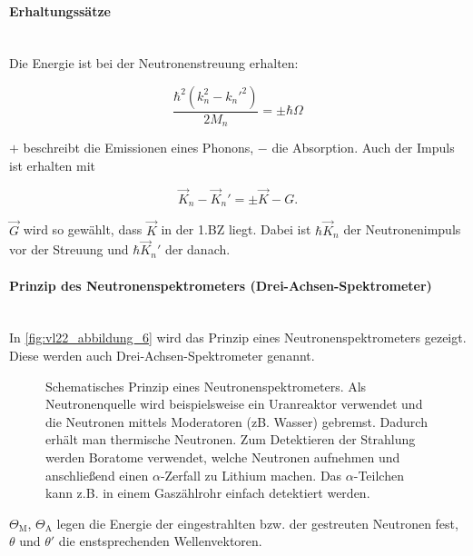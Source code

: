 \paragraph{Erhaltungssätze}~\\
 Die Energie ist bei der Neutronenstreuung erhalten:
	\begin{important}
		$$
		\frac{\hbar ^2 \left( k_{n}^2 - k_{n}'^2 \right) }{2 M_{n}} = \pm \hbar \Omega
		$$
	\end{important}
	$+$ beschreibt die Emissionen eines Phonons, $-$ die Absorption. Auch der Impuls ist erhalten mit
	\begin{important}
		$$
		\Vec{K}_{n} - \Vec{K}_{n}' = \pm \Vec{K} - G.
		$$
	\end{important}
	$\Vec{G}$ wird so gewählt, dass $\Vec{K}$ in der 1.BZ liegt. Dabei ist $\hbar\vec K_n$ der Neutronenimpuls vor der Streuung und $\hbar\vec K_n'$ der danach.

\paragraph{Prinzip des Neutronenspektrometers (Drei-Achsen-Spektrometer)}~\\
	In \autoref{fig:vl22_abbildung_6} wird das Prinzip eines Neutronenspektrometers gezeigt. Diese werden auch Drei-Achsen-Spektrometer genannt.
	\begin{figure}[H]
		\centering
		\caption{Schematisches Prinzip eines Neutronenspektrometers. 
			Als Neutronenquelle wird beispielsweise ein Uranreaktor verwendet und die Neutronen mittels Moderatoren (zB. Wasser) gebremst.
			Dadurch erhält man thermische Neutronen.
			Zum Detektieren der Strahlung werden Boratome  verwendet, welche Neutronen aufnehmen und anschließend einen $\alpha$-Zerfall zu Lithium  machen.
			Das $\alpha$-Teilchen kann z.B. in einem Gaszählrohr einfach detektiert werden.
		}
		\label{fig:vl22_abbildung_6}
	\end{figure}

	$\Theta_{\text{M}}$, $\Theta_{\text{A}}$ legen die Energie der eingestrahlten bzw. der gestreuten Neutronen fest, $\theta$ und $\theta'$ die enstsprechenden Wellenvektoren.
